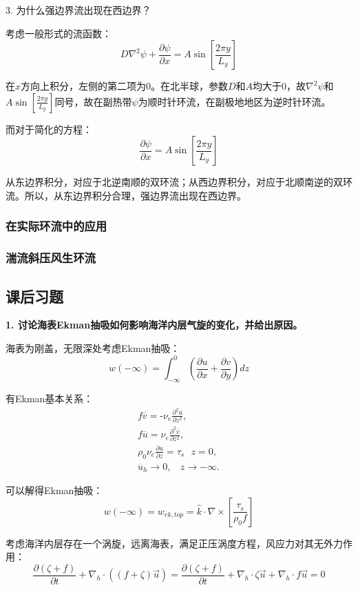 \documentclass{article}
\begin{document}
3. 为什么强边界流出现在西边界？

考虑一般形式的流函数：
$$D{{\nabla }^{2}}\psi +\frac{\partial \psi }{\partial x}=A\sin [ \frac{2\pi y}{{{L}_{y}}}] $$

在$x$方向上积分，左侧的第二项为$0$。在北半球，参数$D$和$A$均大于$0$，故${\nabla }^{2}\psi$和$A\sin [ \frac{2\pi y}{{{L}_{y}}}]$同号，故在副热带$\psi$为顺时针环流，在副极地地区为逆时针环流。

而对于简化的方程：
$$\frac{\partial \psi }{\partial x}=A\sin \left[ \frac{2\pi y}{{{L}_{y}}} \right]$$

从东边界积分，对应于北逆南顺的双环流；从西边界积分，对应于北顺南逆的双环流。所以，从东边界积分合理，强边界流出现在西边界。

\subsubsection{在实际环流中的应用}
\subsubsection{湍流斜压风生环流}

\subsection{课后习题}
\textbf{1. 讨论海表Ekman抽吸如何影响海洋内层气旋的变化，并给出原因。}

海表为刚盖，无限深处考虑Ekman抽吸：
$$w(-\infty) = \int_{-\infty}^0(\frac{\partial u}{\partial x} 
+ \frac{\partial v}{\partial y})dz$$

有Ekman基本关系：
\begin{align}
    & f\overline{v}=\text{-}{{\nu }_{e}}\frac{{{\partial }^{2}}\overline{u}}{\partial {{z}^{2}}}, \\ 
   & f\overline{u}={{\nu }_{e}}\frac{{{\partial }^{2}}\overline{v}}{\partial {{z}^{2}}}, \\ 
   & \rho_0\nu_e\frac{\partial u}{\partial z} = \tau_s\ \ \ z=0, \\ 
   & {{\overline{u}}_{h}}\to 0,\ \ \ \ z\to -\infty .\ \ \ \  
\end{align}

可以解得Ekman抽吸：
$$w(-\infty)={{w}_{ek,top}}=\hat{k}\cdot \nabla \times \left[ \frac{{{\tau }_{s}}}{{{\rho }_{0}}f} \right]$$

考虑海洋内层存在一个涡旋，远离海表，满足正压涡度方程，风应力对其无外力作用：
$$\frac{\partial(\zeta+f)}{\partial t} + \nabla_h\cdot((f+\zeta)\vec{u})
 = \frac{\partial(\zeta+f)}{\partial t} + \nabla_h\cdot\zeta\vec{u}
 + \nabla_h\cdot f\vec{u}=0$$
\end{document}
